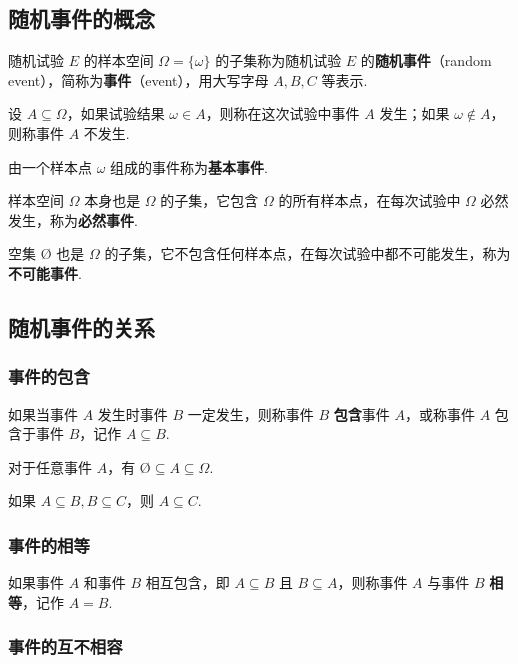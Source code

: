 \subsection{随机事件的概念}

随机试验 $E$ 的样本空间 $\varOmega = \{ \omega \}$ 的子集称为随机试验 $E$ 的\textbf{随机事件}（random event），简称为\textbf{事件}（event），用大写字母 $A,B,C$ 等表示.

设 $A \subseteq \varOmega$，如果试验结果 $\omega \in A$，则称在这次试验中事件 $A$ 发生；如果 $\omega \notin A$，则称事件 $A$ 不发生.

由一个样本点 $\omega$ 组成的事件称为\textbf{基本事件}.

样本空间 $\varOmega$ 本身也是 $\varOmega$ 的子集，它包含 $\varOmega$ 的所有样本点，在每次试验中 $\varOmega$ 必然发生，称为\textbf{必然事件}.

空集 $\text{\O}$ 也是 $\varOmega$ 的子集，它不包含任何样本点，在每次试验中都不可能发生，称为\textbf{不可能事件}.

\subsection{随机事件的关系}

\subsubsection{事件的包含}

如果当事件 $A$ 发生时事件 $B$ 一定发生，则称事件 $B$ \textbf{包含}事件 $A$，或称事件 $A$ 包含于事件 $B$，记作 $A \subseteq B$.

\begin{property}
    \indent 对于任意事件 $A$，有 $\text{\O} \subseteq A \subseteq \varOmega$.
\end{property}

\begin{property}
    \indent 如果 $A \subseteq B,B \subseteq C$，则 $A\subseteq C$.
\end{property}

\subsubsection{事件的相等}

如果事件 $A$ 和事件 $B$ 相互包含，即 $A \subseteq B$ 且 $B \subseteq A$，则称事件 $A$ 与事件 $B$ \textbf{相等}，记作 $A=B$.

\subsubsection{事件的互不相容}

